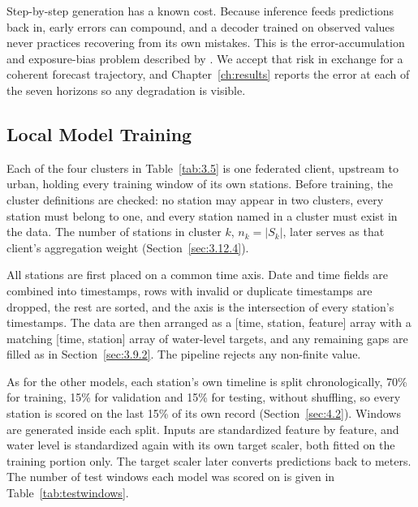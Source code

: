 Step-by-step generation has a known cost. Because inference feeds predictions
back in, early errors can compound, and a decoder trained on observed values
never practices recovering from its own mistakes. This is the error-accumulation
and exposure-bias problem described by \cite{Cui2022}. We accept that risk in
exchange for a coherent forecast trajectory, and Chapter~\ref{ch:results}
reports the error at each of the seven horizons so any degradation is visible.

\subsection{Local Model Training}
\label{sec:3.12.2}

Each of the four clusters in Table~\ref{tab:3.5} is one federated client, upstream
to urban, holding every training window of its own stations. Before training,
the cluster definitions are checked: no station may appear in two clusters,
every station must belong to one, and every station named in a cluster must
exist in the data. The number of stations in cluster $k$, $n_k = |S_k|$, later
serves as that client's aggregation weight (Section~\ref{sec:3.12.4}).

All stations are first placed on a common time axis. Date and time fields are
combined into timestamps, rows with invalid or duplicate timestamps are dropped,
the rest are sorted, and the axis is the intersection of every station's
timestamps. The data are then arranged as a [time, station, feature] array with
a matching [time, station] array of water-level targets, and any remaining gaps
are filled as in Section~\ref{sec:3.9.2}. The pipeline rejects any non-finite
value.

As for the other models, each station's own timeline is split chronologically,
70\% for training, 15\% for validation and 15\% for testing, without shuffling,
so every station is scored on the last 15\% of its own record
(Section~\ref{sec:4.2}). Windows are generated inside each split. Inputs are
standardized feature by feature, and water level is standardized again with its
own target scaler, both fitted on the training portion only. The target scaler
later converts predictions back to meters. The number of test windows each
model was scored on is given in Table~\ref{tab:testwindows}.

